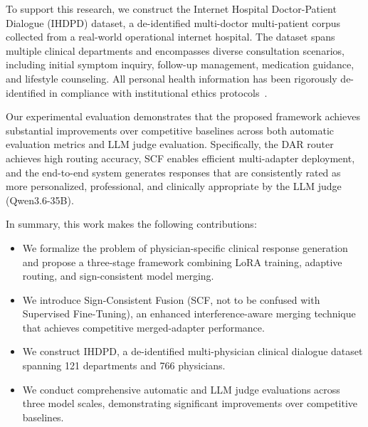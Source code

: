 To support this research, we construct the Internet Hospital Doctor-Patient Dialogue (IHDPD) dataset, a de-identified multi-doctor multi-patient corpus collected from a real-world operational internet hospital. The dataset spans multiple clinical departments and encompasses diverse consultation scenarios, including initial symptom inquiry, follow-up management, medication guidance, and lifestyle counseling. All personal health information has been rigorously de-identified in compliance with institutional ethics protocols~\cite{johnsonMIMICIIIFreelyAccessible2016}.

Our experimental evaluation demonstrates that the proposed framework achieves substantial improvements over competitive baselines across both automatic evaluation metrics and LLM judge evaluation. Specifically, the DAR router achieves high routing accuracy, SCF enables efficient multi-adapter deployment, and the end-to-end system generates responses that are consistently rated as more personalized, professional, and clinically appropriate by the LLM judge (Qwen3.6-35B).


In summary, this work makes the following contributions:
\begin{itemize}
\item We formalize the problem of physician-specific clinical response generation and propose a three-stage framework combining LoRA training, adaptive routing, and sign-consistent model merging.
\item We introduce Sign-Consistent Fusion (SCF, not to be confused with Supervised Fine-Tuning), an enhanced interference-aware merging technique that achieves competitive merged-adapter performance.
\item We construct IHDPD, a de-identified multi-physician clinical dialogue dataset spanning 121 departments and 766 physicians.
\item We conduct comprehensive automatic and LLM judge evaluations across three model scales, demonstrating significant improvements over competitive baselines.
\end{itemize}


